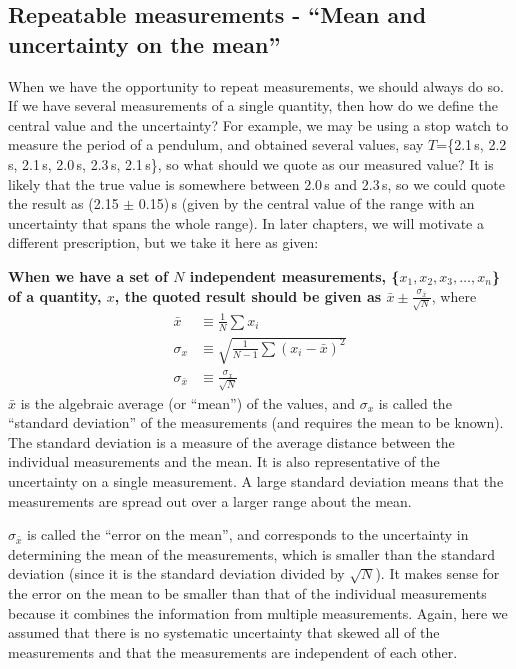 \subsection{Repeatable measurements - ``Mean and uncertainty on the mean''}
When we have the opportunity to repeat measurements, we should always do so. If we have several measurements of a single quantity, then how do we define the central value and the uncertainty? For example, we may be using a stop watch to measure the period of a pendulum, and obtained several values, say $T$=\{2.1\,s, 2.2\,s, 2.1\,s, 2.0\,s, 2.3\,s, 2.1\,s\}, so what should we quote as our measured value? It is likely that the true value is somewhere between 2.0\,s and 2.3\,s, so we could quote the result as (2.15 $\pm$ 0.15)\,s (given by the central value of the range with an uncertainty that spans the whole range). In later chapters, we will motivate a different prescription, but we take it here as given:

\textbf{When we have a set of $N$ independent measurements, \{$x_1, x_2, x_3, \dots, x_n$\} of a quantity, $x$, the quoted result should be given as $\bar x \pm \frac{\sigma_{\bar x}}{\sqrt{N}}$}, where
\begin{align}
\label{eqn:MeanAndStd}
\bar x &\equiv \frac{1}{N}\sum x_i \nonumber\\
\sigma_x &\equiv \sqrt{\frac{1}{N-1}\sum (x_i-\bar x)^2}\nonumber\\
\sigma_{\bar x} &\equiv \frac{\sigma_x}{\sqrt{N}}
\end{align}
$\bar x$ is the algebraic average (or ``mean'') of the values, and $\sigma_x$ is called the ``standard deviation'' of the measurements (and requires the mean to be known). The standard deviation is a measure of the average distance between the individual measurements and the mean. It is also representative of the uncertainty on a single measurement. A large standard deviation means that the measurements are spread out over a larger range about the mean.

$\sigma_{\bar x}$ is called the ``error on the mean'', and corresponds to the uncertainty in determining the mean of the measurements, which is smaller than the standard deviation (since it is the standard deviation divided by $\sqrt{N}$). It makes sense for the error on the mean to be smaller than that of the individual measurements because it combines the information from multiple measurements. Again, here we assumed that there is no systematic uncertainty that skewed all of the measurements and that the measurements are independent of each other.

